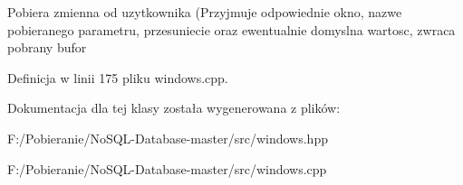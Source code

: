 Pobiera zmienna od uzytkownika (Przyjmuje odpowiednie okno, nazwe pobieranego parametru, przesuniecie oraz ewentualnie domyslna wartosc, zwraca pobrany bufor 

Definicja w linii 175 pliku windows.\+cpp.



Dokumentacja dla tej klasy została wygenerowana z plików\+:\begin{DoxyCompactItemize}
\item 
F\+:/\+Pobieranie/\+No\+S\+Q\+L-\/\+Database-\/master/src/windows.\+hpp\item 
F\+:/\+Pobieranie/\+No\+S\+Q\+L-\/\+Database-\/master/src/windows.\+cpp\end{DoxyCompactItemize}
